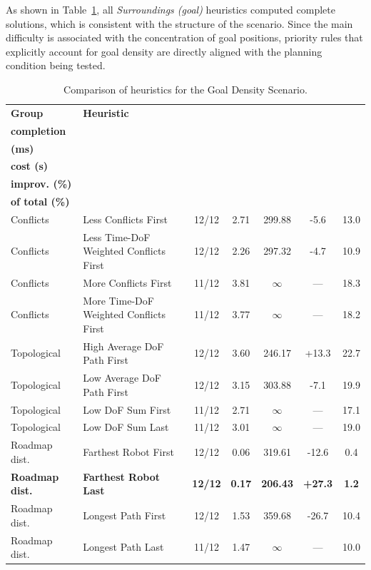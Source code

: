 As shown in Table~\ref{tab:heuristics_goal_density}, all \textit{Surroundings (goal)} heuristics
computed complete solutions, which is consistent with the structure of the scenario. Since the main
difficulty is associated with the concentration of goal positions, priority rules that explicitly
account for goal density are directly aligned with the planning condition being tested.

\begin{table}[H]
\centering
\caption{Comparison of heuristics for the Goal Density Scenario.}
\label{tab:heuristics_goal_density}
\scriptsize
\setlength{\tabcolsep}{3pt}
\begin{tabular}{@{}llccccc@{}}
\toprule
\textbf{Group} &
\textbf{Heuristic} &
\makecell{\textbf{Robot}\\\textbf{completion}} &
\makecell{\textbf{t perm.}\\\textbf{(ms)}} &
\makecell{\textbf{Excess}\\\textbf{cost (s)}} &
\makecell{\textbf{Cost}\\\textbf{improv. (\%)}} &
\makecell{\textbf{Perm. time}\\\textbf{of total (\%)}} \\
\midrule

Conflicts & Less Conflicts First & 12/12 & 2.71 & 299.88 & -5.6 & 13.0 \\
Conflicts & Less Time-DoF Weighted Conflicts First & 12/12 & 2.26 & 297.32 & -4.7 & 10.9 \\
Conflicts & More Conflicts First & 11/12 & 3.81 & $\infty$ & --- & 18.3 \\
Conflicts & More Time-DoF Weighted Conflicts First & 11/12 & 3.77 & $\infty$ & --- & 18.2 \\

\midrule

Topological & High Average DoF Path First & 12/12 & 3.60 & 246.17 & +13.3 & 22.7 \\
Topological & Low Average DoF Path First & 12/12 & 3.15 & 303.88 & -7.1 & 19.9 \\
Topological & Low DoF Sum First & 11/12 & 2.71 & $\infty$ & --- & 17.1 \\
Topological & Low DoF Sum Last & 11/12 & 3.01 & $\infty$ & --- & 19.0 \\

\midrule

Roadmap dist. & Farthest Robot First & 12/12 & 0.06 & 319.61 & -12.6 & 0.4 \\
\textbf{Roadmap dist.} & \textbf{Farthest Robot Last} & \textbf{12/12} & \textbf{0.17} & \textbf{206.43} & \textbf{+27.3} & \textbf{1.2} \\
Roadmap dist. & Longest Path First & 12/12 & 1.53 & 359.68 & -26.7 & 10.4 \\
Roadmap dist. & Longest Path Last & 11/12 & 1.47 & $\infty$ & --- & 10.0 \\


\end{tabular}
\end{table}
